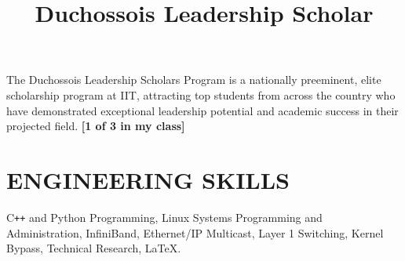 \documentclass{res}
\begin{document}
\begin{resume}
\title{{\bf Duchossois Leadership Scholar}}
\begin{position}
  The Duchossois Leadership Scholars Program is a nationally preeminent, elite scholarship program at IIT, attracting top students from across the country who have demonstrated exceptional leadership potential and academic success in their projected field. {\bf [1 of 3 in my class]}
\end{position}
 
\section{ENGINEERING SKILLS}
C\texttt{++} and Python Programming, Linux Systems Programming and Administration, InfiniBand, Ethernet/IP Multicast, Layer 1 Switching, Kernel Bypass, Technical Research, \LaTeX{}.
 
\end{resume}
\end{document}

